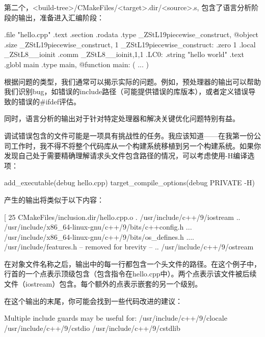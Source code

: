 第二个，<build-tree>/CMakeFiles/<target>.dir/<source>.s, 包含了语言分析阶段的输出，准备进入汇编阶段：

\begin{shell}
        .file "hello.cpp"
        .text
        .section .rodata
        .type _ZStL19piecewise_construct, @object
        .size _ZStL19piecewise_construct, 1
_ZStL19piecewise_construct:
        .zero 1
        .local _ZStL8__ioinit
        .comm _ZStL8__ioinit,1,1
.LC0:
        .string "hello world"
        .text
        .globl main
        .type main, @function
main:
( ... )
\end{shell}

根据问题的类型，我们通常可以揭示实际的问题。例如，预处理器的输出可以帮助我们识别bug，如错误的include路径（可能提供错误的库版本），或者定义错误导致的错误的\#ifdef评估。

同时，语言分析的输出对于针对特定处理器和解决关键优化问题特别有益。


调试错误包含的文件可能是一项具有挑战性的任务。我应该知道——在我第一份公司工作时，我不得不将整个代码库从一个构建系统移植到另一个构建系统。如果你发现自己处于需要精确理解请求头文件包含路径的情况，可以考虑使用-H编译选项：


\begin{cmake}
add_executable(debug hello.cpp)
target_compile_options(debug PRIVATE -H)
\end{cmake}

产生的输出将类似于以下内容：

\begin{shell}
[ 25%
  CMakeFiles/inclusion.dir/hello.cpp.o
. /usr/include/c++/9/iostream
.. /usr/include/x86_64-linux-gnu/c++/9/bits/c++config.h
... /usr/include/x86_64-linux-gnu/c++/9/bits/os_defines.h
.... /usr/include/features.h
-- removed for brevity --
.. /usr/include/c++/9/ostream
\end{shell}

在对象文件名称之后，输出中的每一行都包含一个头文件的路径。在这个例子中，行首的一个点表示顶级包含（包含指令在hello.cpp中）。两个点表示该文件被后续文件（iostream）包含。每个额外的点表示嵌套的另一个级别。

在这个输出的末尾，你可能会找到一些代码改进的建议：

\begin{shell}
Multiple include guards may be useful for:
/usr/include/c++/9/clocale
/usr/include/c++/9/cstdio
/usr/include/c++/9/cstdlib
\end{shell}

